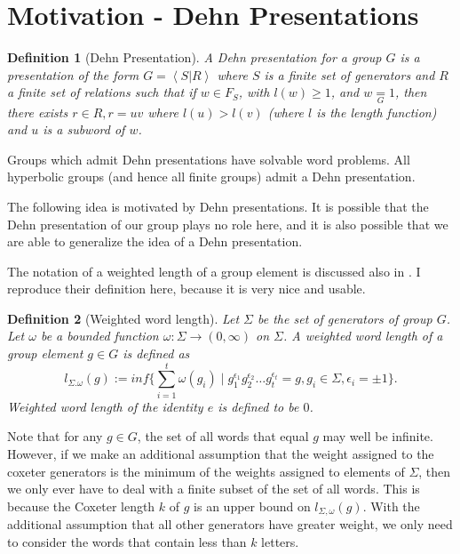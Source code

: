 \documentclass{article}
\newtheorem{definition}{Definition}
\begin{document}
\section{Motivation - Dehn Presentations}
\begin{definition}[Dehn Presentation]
\label{def:dehn}
A Dehn presentation for a group $G$ is a presentation of the form $G = \left<S|R\right>$ where $S$ is a finite set of generators and $R$ a finite set of relations such that if $w \in F_S$, with $l(w) \geq 1 $, and $w \underset{G}{=} 1$, then there exists $r \in R, r = uv$ where $l(u)>l(v)$ (where $l$ is the length function) and $u$ is a subword of $w$. 
\end{definition}
Groups which admit Dehn presentations have solvable word problems. All hyperbolic groups (and hence all finite groups) admit a Dehn presentation.

The following idea is motivated by Dehn presentations. It is possible that the Dehn presentation of our group plays no role here, and it is also possible that we are able to generalize the idea of a Dehn presentation.

The notation of a weighted length of a group element is discussed also in \citep{abels2004reductive}. I reproduce their definition here, because it is very nice and usable. 

\begin{definition}[Weighted word length]
\label{def:wwl}
Let $\Sigma$ be the set of generators of group $G$. Let $\omega$ be a bounded function $\omega:\Sigma \rightarrow (0,\infty)$ on $\Sigma$. A weighted word length of a group element $g \in G$ is defined as 
\[l_{\Sigma.\omega}(g):=inf \{\sum_{i=1}^{t}{\omega(g_i)} \mid g_1^{\epsilon_1}g_2^{\epsilon_2} \hdots g_t^{\epsilon_t}=g, g_i \in \Sigma, \epsilon_i = \pm 1\}.\]
Weighted word length of the identity $e$ is defined to be $0$. 
\end{definition}
Note that for any $g \in G$, the set of all words that equal $g$ may well be infinite. However, if we make an additional assumption that the weight assigned to the coxeter generators is the minimum of the weights assigned to elements of $\Sigma$, then we only ever have to deal with a finite subset of the set of all words. This is because the Coxeter length $k$ of $g$ is an upper bound on $l_{\Sigma,\omega}(g)$. With the additional assumption that all other generators have greater weight, we only need to consider the words that contain less than $k$ letters.
\end{document}
